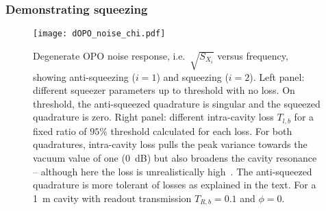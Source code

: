 
\subsubsection{Demonstrating squeezing}

\begin{figure}
	\centering
	\texttt{[image: dOPO\_noise\_chi.pdf]}
	\caption{Degenerate OPO noise response, i.e.\ $\sqrt{S_{X_i}}$ versus frequency, showing anti-squeezing ($i=1$) and squeezing ($i=2$). Left panel: different squeezer parameters up to threshold with no loss. On threshold, the anti-squeezed quadrature is singular and the squeezed quadrature is zero. Right panel: different intra-cavity loss $T_{l,b}$ for a fixed ratio of $95\%$ threshold calculated for each loss. For both quadratures, intra-cavity loss pulls the peak variance towards the vacuum value of one (0~dB) but also broadens the cavity resonance -- although here the loss is unrealistically high~\cite{}. The anti-squeezed quadrature is more tolerant of losses as explained in the text. For a 1~m cavity with readout transmission $T_{R,b}=0.1$ and $\phi=0$.}
	\label{fig:dOPO_variances}
\end{figure}

